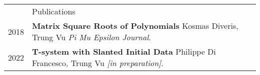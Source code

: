 \documentclass[letterpaper, 11pt]{article}
\newcommand{\headingfont}{\Large\color{Red}}
\newenvironment{SectionTable}[1]{
	\renewcommand*{\arraystretch}{1.7}
	\setlength{\tabcolsep}{10pt}
	\begin{longtable}{Rp{5.2in}} & #1 \\}
	{\end{longtable}\vspace{-.3cm}}
\begin{document}
	
	\begin{SectionTable}{\headingfont Publications} 
		2018 & 
		\textbf{Matrix Square Roots of Polynomials} \newline
		Kosmas Diveris, Trung Vu \newline
		\textit{Pi Mu Epsilon Journal}. \\

		2022 & 
		\textbf{T-system with Slanted Initial Data} \newline
		Philippe Di Francesco, Trung Vu \newline
		\textit{[in preparation]}. \\
		
		
		
	\end{SectionTable}
	
\end{document}
